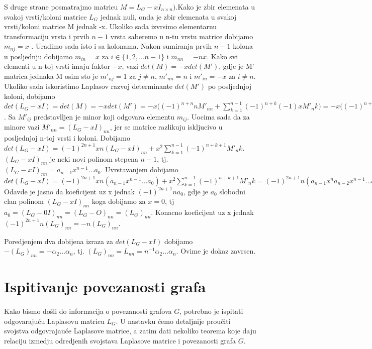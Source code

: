 \documentclass[11pt]{article}
\begin{document}
		S druge strane posmatrajmo matricu $M = L_G - xI_{n \times n})$.Kako je zbir elemenata u svakoj vrsti/koloni matrice $L_G$ jednak nuli, onda je zbir elemenata u svakoj vrsti/koloni matrice M jednak -x.
		Ukoliko sada izvrsimo elementarnu transformaciju vrsta i prvih $n-1$ vrsta saberemo u n-tu vrstu matrice dobijamo  $m_{nj} = x$ .
		Uradimo sada isto i sa kolonama. Nakon sumiranja prvih $n-1$ kolona u posljednju dobijamo $m_{in} = x$ za $i \in \{1,2, \dots n-1\}$ i $m_{nn} = -nx$.
		Kako svi elementi u n-toj vrsti imaju faktor $-x$, vazi $det(M)=-x det(M')$, gdje je M' matrica jednaka M osim sto je $m'_{nj} = 1$ za $j \neq n$, $m'_{nn} = n$ i $m'_{in} = -x$ za $i \neq n$. Ukoliko sada iskoristimo 
		Laplasov razvoj determinante $det(M')$ po posljednjoj koloni, dobijamo $det(L_G - xI) = det(M) = -x det(M') = -x \big( (-1)^{n+n}n M'_{nn} + \sum_{k=1}^{n-1}(-1)^{n+k}(-1)xM'_nk \big) = 
		-x \big( (-1)^{n+n} nM'_{nn} + x\sum_{k=1}^{n-1}(-1)^{n+k+1}M'_nk \big) = (-1)^{2n+1} xnM'_{nn} + x^2 \sum_{k=1}^{n-1}(-1)^{n+k+1}M'_nk $. Sa $M'_{ij}$ predstavlljen je minor koji odgovara elementu $m_{ij}$.
		Uocima sada da za minore vazi $M'_{nn} = (L_G - xI)_{nn}$, jer se matrice razlikuju iskljucivo u posljednjoj n-toj vrsti i koloni. Dobijamo $det(L_G - xI) = (-1)^{2n+1} xn(L_G- xI)_{nn} + x^2 \sum_{k=1}^{n-1}(-1)^{n+k+1}M'_nk $. $(L_G- xI)_{nn}$ je neki novi polinom stepena $n-1$, tj. $(L_G- xI)_{nn} = a_{n-1}x^{n-1} \dots a_0$. Uvrstavanjem dobijamo $det(L_G - xI) = (-1)^{2n+1} xn ( a_{n-1}x^{n-1} \dots a_0) + x^2 \sum_{k=1}^{n-1}(-1)^{n+k+1}M'_nk =  (-1)^{2n+1} n ( a_{n-1}x^n a_{n-2}x^{n-1 }\dots a_0x) + x^2 \sum_{k=1}^{n-1}(-1)^{n+k+1}M'_nk $
	Odavde je jasno da koeficijent uz x jednak $ (-1)^{2n+1} n a_0$, gdje je $a_0$ slobodni clan polinom $(L_G- xI)_{nn}$ koga dobijamo za $x=0$, tj $a_0 = (L_G- 0I)_{nn} = (L_G- O)_{nn} = (L_G)_{nn}$. Konacno
	koeficijent uz x jednak $ (-1)^{2n+1} n (L_G)_{nn} = - n (L_G)_{nn}$.
	
	
		Poredjenjem dva dobijena izraza za $det(L_G - xI)$ dobijamo $- (L_G)_{nn} = - \alpha_2 \dots \alpha_n$, tj. $(L_G)_{nn} = L_{nn} = n^{-1} \alpha_2 \dots \alpha_n$. 
		Ovime je dokaz zavrsen.
		
	\section{Ispitivanje povezanosti grafa}
	\paragraph{}
	Kako bismo došli do informacija o povezanosti grafova $G$, potrebno je ispitati odgovarajuću Laplasovu matricu $L_G$. U nastavku ćemo detaljnije proučiti svojstva odgovrajauće Laplasove matrice, a zatim dati nekoliko teorema koje daju relaciju izmedju odredjenih svojstava Laplasove matrice i povezanosti grafa $G$.
	
\end{document}
